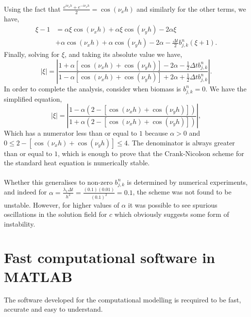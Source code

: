 Using the fact that $ \frac{e^{i \nu_x h}+  e^{-i \nu_x h}}{2} = \cos(\nu_x h)$ and similarly for
the other terms, we have,
\begin{equation*}
    \begin{split}
        \xi - 1 &=
         \alpha \xi \cos(\nu_x h) 
       + \alpha \xi \cos(\nu_y h) 
       -2 \alpha \xi   \\
       &+\alpha \cos(\nu_x h) 
       + \alpha \cos(\nu_y h) 
       -2 \alpha
       -\frac{\Delta t}{2} b_{j,k}^{n} (\xi + 1).
    \end{split}
\end{equation*}
Finally, solving for $\xi$, and taking its absolute value we have,
\begin{equation*}
    |\xi| = \left| \frac{1 + \alpha \left[ \cos(\nu_x h) + \cos(\nu_y h) \right] - 2 \alpha -\frac{1}{2} \Delta t b_{j,k}^{n} }
                        {1 -\alpha \left[ \cos(\nu_x h) + \cos(\nu_y h) \right]  + 2 \alpha +\frac{1}{2} \Delta t b_{j,k}^{n}} \right|.
\end{equation*}
In order to complete the analysis, consider when biomass is $b_{j,k}^{n} = 0$. We have the simplified
equation,
\begin{equation*}
    |\xi| = \left| \frac{1 -\alpha(2 - \left[ \cos(\nu_x h) + \cos(\nu_y h) \right]) }
                        {1 +\alpha(2 - \left[ \cos(\nu_x h) + \cos(\nu_y h)\right])} \right|,
\end{equation*}
Which has a numerator less than or equal to $1$ because $\alpha > 0$ and 
$0 \leq 2 - \left[ \cos(\nu_x h) + \cos(\nu_y h) \right] \leq 4$. The denominator is 
always greater than or equal to $1$, which is enough to prove that
the Crank-Nicolson scheme for the standard heat equation is numerically stable.
\\
\\
Whether this generalises to non-zero $b_{j,k}^{n}$ is determined by numerical experiments, and 
indeed for $\alpha = \frac{\lambda_1 \Delta t}{h^2} = \frac{(0.1) (0.01)}{(0.1)^2} = 0.1$, the scheme 
was not found to be unstable. However, for higher values of $\alpha$ it was possible to see spurious 
oscillations in the solution field for $c$ which obviously suggests some form of instability.

\section{ Fast computational software in MATLAB }
The software developed for the computational modelling is recquired
to be fast, accurate and easy to understand.


